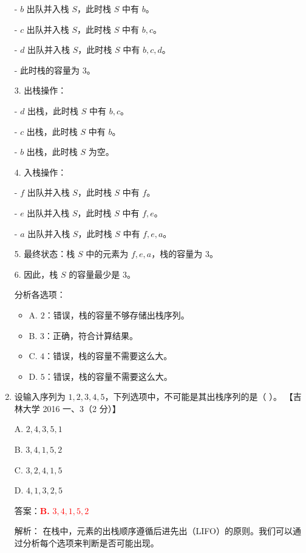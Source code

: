 \documentclass[lang=cn,newtx,10pt,scheme=chinese]{../../../elegantbook}
\begin{document}
\begin{enumerate}
       - $b$ 出队并入栈 $S$，此时栈 $S$ 中有 $b$。

       - $c$ 出队并入栈 $S$，此时栈 $S$ 中有 $b, c$。

       - $d$ 出队并入栈 $S$，此时栈 $S$ 中有 $b, c, d$。

       - 此时栈的容量为 3。

    3. 出栈操作：

         - $d$ 出栈，此时栈 $S$ 中有 $b, c$。
    
         - $c$ 出栈，此时栈 $S$ 中有 $b$。
    
         - $b$ 出栈，此时栈 $S$ 为空。

    4. 入栈操作：

            - $f$ 出队并入栈 $S$，此时栈 $S$ 中有 $f$。
    
            - $e$ 出队并入栈 $S$，此时栈 $S$ 中有 $f, e$。
    
            - $a$ 出队并入栈 $S$，此时栈 $S$ 中有 $f, e, a$。

    5. 最终状态：栈 $S$ 中的元素为 $f, e, a$，栈的容量为 3。

    6. 因此，栈 $S$ 的容量最少是 3。

    分析各选项：
    \begin{itemize}
        \item A. $2$：错误，栈的容量不够存储出栈序列。
        
        \item B. $3$：正确，符合计算结果。
        
        \item C. $4$：错误，栈的容量不需要这么大。
        
        \item D. $5$：错误，栈的容量不需要这么大。
    \end{itemize}

    \item 设输入序列为 $1, 2, 3, 4, 5$，下列选项中，不可能是其出栈序列的是（ ）。  
    【吉林大学 2016 一、3（2 分）】  

    A. $2, 4, 3, 5, 1$  

    B. $3, 4,1,5,2$  

    C. $3, 2, 4, 1, 5$  

    D. $4,1,3,2,5$  

    答案：\textcolor{red}{\textbf{B.} $3, 4,1,5,2$}

    解析：
    在栈中，元素的出栈顺序遵循后进先出（LIFO）的原则。我们可以通过分析每个选项来判断是否可能出现。


\end{enumerate}
\end{document}
